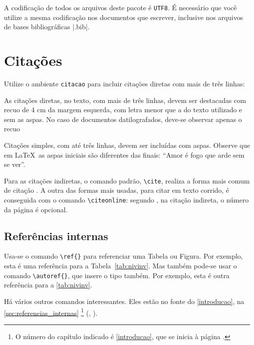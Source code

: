 A codificação de todos os arquivos deste pacote é \texttt{UTF8}.
  É necessário que você utilize a mesma codificação nos documentos que escrever, inclusive nos arquivos de bases bibliográficas |.bib|.


\section{Citações}

Utilize o ambiente \texttt{citacao} para incluir citações diretas com mais de três linhas:

\begin{citacao}
As citações diretas, no texto, com mais de três linhas, devem ser destacadas com recuo de 4 cm da margem esquerda, com letra menor que a do texto utilizado e sem as aspas.
  No caso de documentos datilografados, deve-se observar apenas o recuo \cite[5.3]{NBR10520:2002}
\end{citacao}

Citações simples, com até três linhas, devem ser incluídas com aspas.
  Observe que em \LaTeX~as aspas iniciais são diferentes das finais: ``Amor é fogo que arde sem se ver''.

Para as citações indiretas, o comando padrão, \verb|\cite|, realiza a forma mais comum de citação \cite{SisbiUnipampa2011}.
  A outra das formas mais usadas, para citar em texto corrido, é conseguida com o comando \verb|\citeonline|: segundo , na citação indireta, o número da página é opcional.


\subsection{Referências internas}\label{sec:referencias_internas}

Usa-se o comando \verb|\ref{}| para referenciar uma Tabela ou Figura.
  Por exemplo, esta é uma referência para a Tabela~\ref{tab:nivinv}.
  Mas também pode-se usar o comando \verb|\autoref{}|, que insere o tipo também.
  Por exemplo, esta é outra referência para a \autoref{tab:nivinv}.

Há vários outros comandos interessantes.
  Eles estão no fonte do \autoref{introducao}, na \autoref{sec:referencias_internas}
  \footnote{O número do capítulo indicado é \ref{introducao}, que se inicia à página \pageref{introducao}.}
  (, ).



